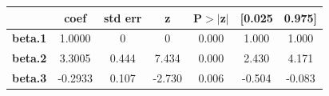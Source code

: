 \begin{center}
\begin{tabular}{lcccccc}
                & \textbf{coef} & \textbf{std err} & \textbf{z} & \textbf{P$> |$z$|$} & \textbf{[0.025} & \textbf{0.975]}  \\
\midrule
\textbf{beta.1} &       1.0000  &            0     &         0  &         0.000        &        1.000    &        1.000     \\
\textbf{beta.2} &       3.3005  &        0.444     &     7.434  &         0.000        &        2.430    &        4.171     \\
\textbf{beta.3} &      -0.2933  &        0.107     &    -2.730  &         0.006        &       -0.504    &       -0.083     \\
\bottomrule
\end{tabular}
\end{center}